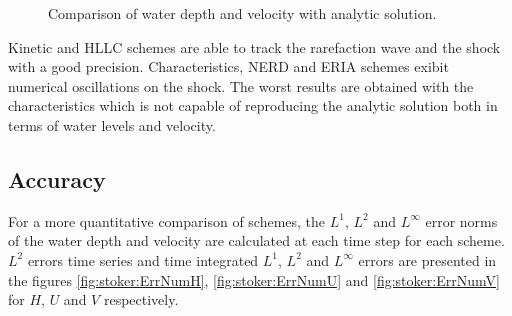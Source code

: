 \begin{figure}[H]
\begin{minipage}[t]{0.5\textwidth}
 \centering
\end{minipage}%
\begin{minipage}[t]{0.5\textwidth}
 \centering
\end{minipage}
\begin{minipage}[t]{0.5\textwidth}
 \centering
\end{minipage}%
\begin{minipage}[t]{0.5\textwidth}
 \centering
\end{minipage}
\begin{minipage}[t]{0.5\textwidth}
 \centering
\end{minipage}%
\begin{minipage}[t]{0.5\textwidth}
 \centering
\end{minipage}
  \caption{Comparison of water depth and velocity with analytic solution.}
  \label{fig:stoker:comparison}
\end{figure}

Kinetic and HLLC schemes are able to track the rarefaction wave and the shock with a good precision.
Characteristics, NERD and ERIA schemes exibit numerical oscillations on the shock.
The worst results are obtained with the characteristics which is not capable of reproducing the analytic solution both in terms of water levels and velocity.

\subsection{Accuracy}

For a more quantitative comparison of schemes, the $L^1$, $L^2$ and $L^\infty$ error norms
of the water depth and velocity are calculated at each time step for each scheme.
$L^2$ errors time series and time integrated $L^1$, $L^2$ and $L^\infty$ errors are presented in the figures \ref{fig:stoker:ErrNumH}, \ref{fig:stoker:ErrNumU} and \ref{fig:stoker:ErrNumV} for $H$, $U$ and $V$ respectively.

